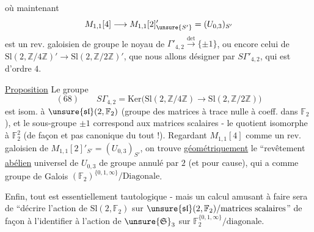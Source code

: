où maintenant
\[
M_{1,1}[4]\longrightarrow M_{1,1}[2]'_{\unsure{S'}}
=(U_{0,3})_{S'}
\]
est un rev. galoisien de groupe le noyau de
$\Gamma'_{4,2}\xrightarrow{\det}\{\pm1\}$, ou encore celui de
$\mathrm{Sl}(2,\mathbb Z/4\mathbb Z)'
\longrightarrow\mathrm{Sl}(2,\mathbb Z/2\mathbb Z)'$,
que nous allons désigner par $S\Gamma'_{4,2}$, qui est d'ordre $4$.

\uline{Proposition} Le groupe
\[
(68)\qquad
S\Gamma_{4,2}
=
\mathrm{Ker}\bigl(
\mathrm{Sl}(2,\mathbb Z/4\mathbb Z)
\longrightarrow
\mathrm{Sl}(2,\mathbb Z/2\mathbb Z)
\bigr)
\]
est isom. à 
$\unsure{\mathfrak{sl}}(2,\mathbb F_2)$
(groupe des matrices à trace nulle à coeff. dans $\mathbb F_2$),
et le sous-groupe $\pm1$ correspond aux matrices scalaires -
le quotient 
 isomorphe à  $\mathbb F_2^2$
(de façon  et pas canonique du tout !).
Regardant $M_{1,1}[4]$ comme un rev. galoisien de
$M_{1,1}[2]'_{S'}=(U_{0,3})_{S'}$, on trouve
\uline{géométriquement} le ``revêtement \uline{abélien} universel de
$U_{0,3}$ de groupe annulé par $2$ (et pour cause), qui a comme groupe
de Galois $(\mathbb F_2)^{\{0,1,\infty\}}/\mathrm{Diagonale}$.


Enfin, tout est essentiellement tautologique - mais un calcul amusant à
faire sera de ``décrire l'action de $\mathrm{Sl}(2,\mathbb F_2)$ sur
$\unsure{\mathfrak{sl}}(2,\mathbb F_2)/\text{matrices scalaires}$''
de façon à l'identifier à l'action de $\unsure{\mathfrak S}_3$ sur
$\mathbb F_2^{\{0,1,\infty\}}/\text{diagonale}$.

